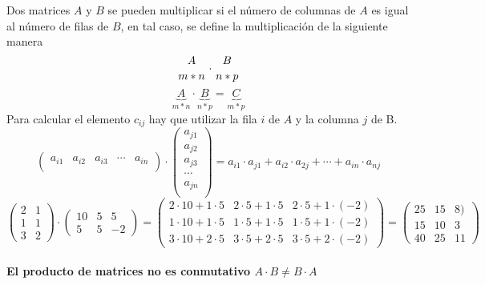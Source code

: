 \begin{definicion}
Dos matrices $A$ y $B$ se pueden multiplicar si el número de columnas de $A$ es igual al número de filas de $B$, en tal caso, se define la multiplicación de la siguiente manera
$${A \atop m\ast n}\cdot {B \atop n\ast p}$$
$$\underbrace{A}_{m \ast n} \cdot \underbrace{B}_{n\ast p}=\underbrace{C}_{m\ast p}$$
Para calcular el elemento $c_{ij}$ hay que utilizar la fila $i$ de $A$ y la columna $j$ de B.
$$\begin{pmatrix}
	a_{i1} & a_{i2}&a_{i3}& \cdots &a_{in} \\
\end{pmatrix}\cdot \begin{pmatrix}
	a_{j1} \\ a_{j2}\\a_{j3}\\ \cdots \\a_{jn} \\
\end{pmatrix}=a_{i1}\cdot a_{j1}+ a_{i2} \cdot a_{2j} + \cdots +a_{in}\cdot a_{nj}$$
$$\begin{pmatrix}
	2 & 1 \\
	1 & 1 \\
	3 & 2
\end{pmatrix}\cdot \begin{pmatrix}
	10 & 5 &5\\
	5 & 5 &-2
\end{pmatrix}=\begin{pmatrix}
	2\cdot 10 + 1 \cdot 5 & 2\cdot 5 + 1 \cdot 5 & 2\cdot 5 + 1 \cdot (-2)\\
	1\cdot 10 + 1 \cdot 5 & 1\cdot 5 + 1 \cdot 5 & 1\cdot 5 + 1 \cdot (-2)\\
	3\cdot 10 + 2 \cdot 5 & 3\cdot 5 + 2 \cdot 5 & 3\cdot 5 + 2 \cdot (-2)
\end{pmatrix} = \begin{pmatrix}
	25 & 15& 8)\\
	15 & 10 & 3\\
	40 & 25 & 11
\end{pmatrix}  $$\\
\textbf{{\Large El producto de matrices no es conmutativo $A \cdot B \neq B\cdot A$}}

\end{definicion}

